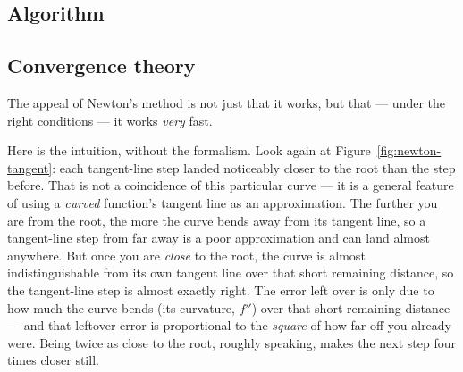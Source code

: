 \subsection{Algorithm}

\begin{center}
\end{center}

\subsection{Convergence theory}

The appeal of Newton's method is not just that it works, but that --- under the right conditions --- it works \emph{very} fast.

Here is the intuition, without the formalism. Look again at Figure~\ref{fig:newton-tangent}: each tangent-line step landed noticeably closer to the root than the step before. That is not a coincidence of this particular curve --- it is a general feature of using a \emph{curved} function's tangent line as an approximation. The further you are from the root, the more the curve bends away from its tangent line, so a tangent-line step from far away is a poor approximation and can land almost anywhere. But once you are \emph{close} to the root, the curve is almost indistinguishable from its own tangent line over that short remaining distance, so the tangent-line step is almost exactly right. The error left over is only due to how much the curve bends (its curvature, $f''$) over that short remaining distance --- and that leftover error is proportional to the \emph{square} of how far off you already were. Being twice as close to the root, roughly speaking, makes the next step four times closer still.

